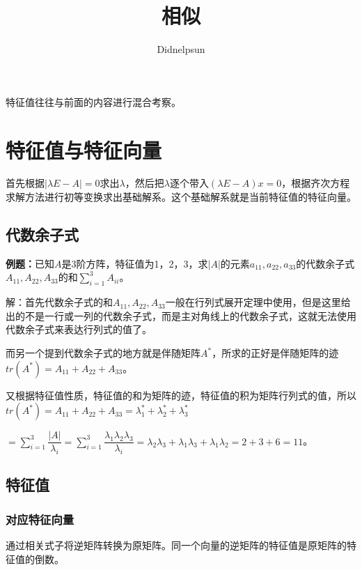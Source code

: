 \documentclass[UTF8, 12pt]{ctexart}
\author{Didnelpsun}
\title{相似}
\date{}
\begin{document}
\maketitle
\pagestyle{empty}
\thispagestyle{empty}
\tableofcontents
\thispagestyle{empty}
\newpage
\pagestyle{plain}
\setcounter{page}{1}

特征值往往与前面的内容进行混合考察。

\section{特征值与特征向量}

首先根据$\vert\lambda E-A\vert=0$求出$\lambda$，然后把$\lambda$逐个带入$(\lambda E-A)x=0$，根据齐次方程求解方法进行初等变换求出基础解系。这个基础解系就是当前特征值的特征向量。

\subsection{代数余子式}

\textbf{例题：}已知$A$是3阶方阵，特征值为1，2，3，求$\vert A\vert$的元素$a_{11},a_{22},a_{33}$的代数余子式$A_{11},A_{22},A_{33}$的和$\sum\limits_{i=1}^3A_{ii}$。

解：首先代数余子式的和$A_{11},A_{22},A_{33}$一般在行列式展开定理中使用，但是这里给出的不是一行或一列的代数余子式，而是主对角线上的代数余子式，这就无法使用代数余子式来表达行列式的值了。

而另一个提到代数余子式的地方就是伴随矩阵$A^*$，所求的正好是伴随矩阵的迹$tr(A^*)=A_{11}+A_{22}+A_{33}$。

又根据特征值性质，特征值的和为矩阵的迹，特征值的积为矩阵行列式的值，所以$tr(A^*)=A_{11}+A_{22}+A_{33}=\lambda_1^*+\lambda_2^*+\lambda_3^*$

$=\sum\limits_{i=1}^3\dfrac{\vert A\vert}{\lambda_i}=\sum\limits_{i=1}^3\dfrac{\lambda_1\lambda_2\lambda_3}{\lambda_i}=\lambda_2\lambda_3+\lambda_1\lambda_3+\lambda_1\lambda_2=2+3+6=11$。

\subsection{特征值}

\subsubsection{对应特征向量}

通过相关式子将逆矩阵转换为原矩阵。同一个向量的逆矩阵的特征值是原矩阵的特征值的倒数。
\end{document}
